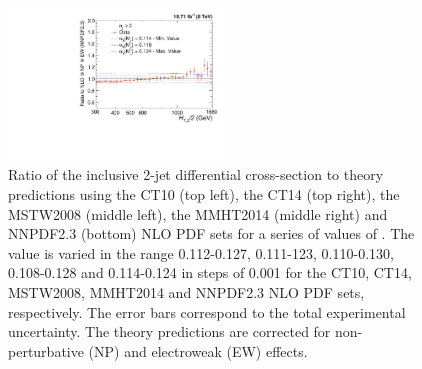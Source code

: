 \begin{figure}[!htbp]
\begin{center}
 \vspace*{3mm}
 \includegraphics[width=0.51\textwidth]{Plots_HT_2_150/Sensitivity_2_ratio_NLO_NNPDF23_EW.pdf}
 \caption{Ratio of the inclusive 2-jet differential cross-section to theory predictions using the CT10 (top left), the CT14 (top right), the MSTW2008 (middle left), the MMHT2014 (middle right) and NNPDF2.3 (bottom) NLO PDF sets for a series of values of \alpsmz. The \alpsmz value is varied in the range 0.112-0.127, 0.111-123, 0.110-0.130, 0.108-0.128 and 0.114-0.124 in steps of 0.001 for the CT10, CT14, MSTW2008, MMHT2014 and NNPDF2.3 NLO PDF sets, respectively. The error bars correspond to the total experimental uncertainty. The theory predictions are corrected for non-perturbative (NP) and electroweak (EW) effects.}
 \label{fig:sensitivity_2}
 \end{center}
\end{figure}

